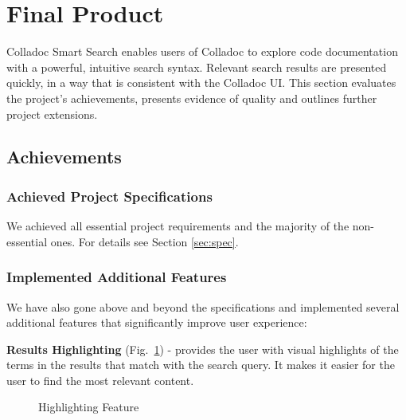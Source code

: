 \section{Final Product}\label{sec:finalproduct}
Colladoc Smart Search enables users of Colladoc to explore code documentation with a powerful, intuitive search syntax. Relevant search results are presented quickly, in a way that is consistent with the Colladoc UI. This section evaluates the project’s achievements, presents evidence of quality and outlines further project extensions.
\subsection{Achievements}

\subsubsection{Achieved Project Specifications}
We achieved all essential project requirements and the majority of the non-essential ones. 
For details see Section \ref{sec:spec}.

\subsubsection{Implemented Additional Features}

We have also gone above and beyond the specifications and implemented several additional features that significantly improve user experience:

\textbf{Results Highlighting} (Fig.~\ref{fig:highlighting}) - provides the user with visual highlights of the terms in the results that match with the search query. It makes it easier for the user to find the most relevant content.

\begin{figure}[h!t]
\begin{center}
\leavevmode
{}
\end{center}
\caption{Highlighting Feature}
\label{fig:highlighting}
\end{figure}


